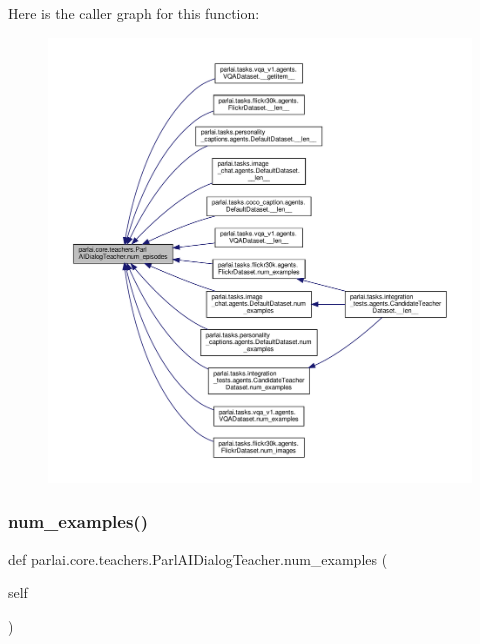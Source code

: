 Here is the caller graph for this function\+:
\nopagebreak
\begin{figure}[H]
\begin{center}
\leavevmode
\includegraphics[width=350pt]{classparlai_1_1core_1_1teachers_1_1ParlAIDialogTeacher_aee1494d5dd0610530b4b93e56010e6f8_icgraph}
\end{center}
\end{figure}
\mbox{\label{classparlai_1_1core_1_1teachers_1_1ParlAIDialogTeacher_a37c1c62c52860da9c63d9f6ed23ae6ae}} 
\subsubsection{\texorpdfstring{num\+\_\+examples()}{num\_examples()}}
{\footnotesize\ttfamily def parlai.\+core.\+teachers.\+Parl\+A\+I\+Dialog\+Teacher.\+num\+\_\+examples (\begin{DoxyParamCaption}\item[{}]{self }\end{DoxyParamCaption})}

